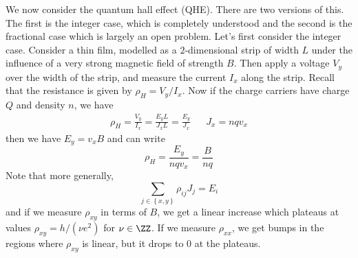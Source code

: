 \documentclass{booc}
\begin{document}
We now consider the quantum hall effect (QHE).
There are two versions of this. 
The first is the integer case, which is completely understood
and the second is the fractional case which is largely an open problem.
Let's first consider the integer case.
Consider a thin film, modelled as a $2$-dimensional strip of width $L$
under the influence of a very strong magnetic field of strength $B$.
Then apply a voltage $V_y$ over the width of the strip,
and measure the current $I_x$ along the strip. 
Recall that the resistance is given by $\rho_H = V_y / I_x$.
Now if the charge carriers have charge $Q$ and density $n$, we have
\begin{align}
\rho_H = \frac{V_y}{I_x}
= \frac{E_y L}{J_x L}
= \frac{E_y}{J_x} &&
J_x = nq v_x
\end{align}
then we have $E_y = v_x B$
and can write
\begin{equation}
\rho_H = \frac{E_y}{nq v_x} = \frac{B}{nq}
\end{equation}
Note that more generally, 
\begin{equation}
\sum_{j\in \left\{ x,y \right\}}\rho_{ij} J_j = 
E_i
\end{equation}
and if we measure $\rho_{xy}$ in terms of $B$, 
we get a linear increase which plateaus at values 
$\rho_{xy} = h/ \left( \nu e^2 \right)$ for $\nu\in \ZZ$. 
If we measure $\rho_{xx}$, we get bumps in the regions where
$\rho_{xy}$ is linear, but it drops to $0$
at the plateaus.
\end{document}
